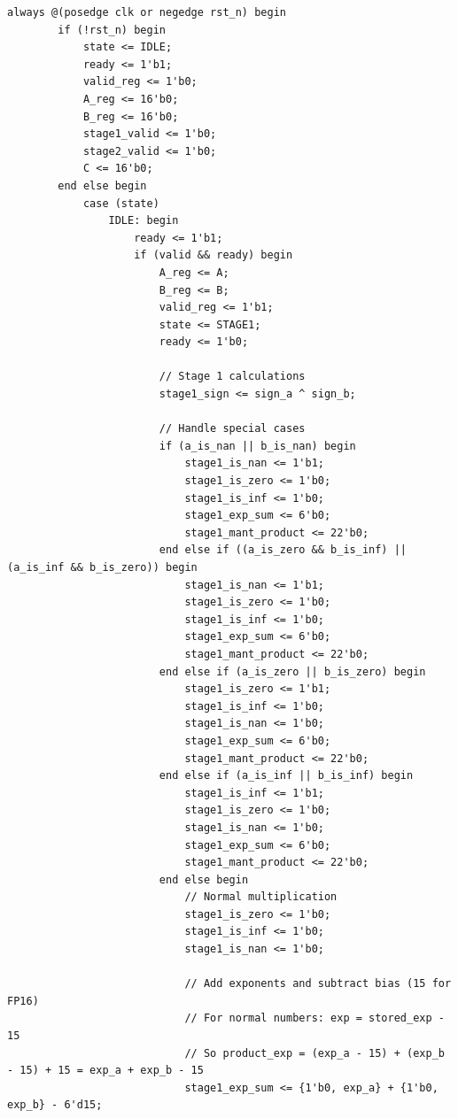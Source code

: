 \documentclass[UTF8]{ctexart}
\begin{document}
\begin{lstlisting}[frame=shadowbox,caption=fp\_multiplier\_generated3.sv]
    always @(posedge clk or negedge rst_n) begin
        if (!rst_n) begin
            state <= IDLE;
            ready <= 1'b1;
            valid_reg <= 1'b0;
            A_reg <= 16'b0;
            B_reg <= 16'b0;
            stage1_valid <= 1'b0;
            stage2_valid <= 1'b0;
            C <= 16'b0;
        end else begin
            case (state)
                IDLE: begin
                    ready <= 1'b1;
                    if (valid && ready) begin
                        A_reg <= A;
                        B_reg <= B;
                        valid_reg <= 1'b1;
                        state <= STAGE1;
                        ready <= 1'b0;
                        
                        // Stage 1 calculations
                        stage1_sign <= sign_a ^ sign_b;
                        
                        // Handle special cases
                        if (a_is_nan || b_is_nan) begin
                            stage1_is_nan <= 1'b1;
                            stage1_is_zero <= 1'b0;
                            stage1_is_inf <= 1'b0;
                            stage1_exp_sum <= 6'b0;
                            stage1_mant_product <= 22'b0;
                        end else if ((a_is_zero && b_is_inf) || (a_is_inf && b_is_zero)) begin
                            stage1_is_nan <= 1'b1;
                            stage1_is_zero <= 1'b0;
                            stage1_is_inf <= 1'b0;
                            stage1_exp_sum <= 6'b0;
                            stage1_mant_product <= 22'b0;
                        end else if (a_is_zero || b_is_zero) begin
                            stage1_is_zero <= 1'b1;
                            stage1_is_inf <= 1'b0;
                            stage1_is_nan <= 1'b0;
                            stage1_exp_sum <= 6'b0;
                            stage1_mant_product <= 22'b0;
                        end else if (a_is_inf || b_is_inf) begin
                            stage1_is_inf <= 1'b1;
                            stage1_is_zero <= 1'b0;
                            stage1_is_nan <= 1'b0;
                            stage1_exp_sum <= 6'b0;
                            stage1_mant_product <= 22'b0;
                        end else begin
                            // Normal multiplication
                            stage1_is_zero <= 1'b0;
                            stage1_is_inf <= 1'b0;
                            stage1_is_nan <= 1'b0;
                            
                            // Add exponents and subtract bias (15 for FP16)
                            // For normal numbers: exp = stored_exp - 15
                            // So product_exp = (exp_a - 15) + (exp_b - 15) + 15 = exp_a + exp_b - 15
                            stage1_exp_sum <= {1'b0, exp_a} + {1'b0, exp_b} - 6'd15;
                            

\end{lstlisting}
\end{document}
